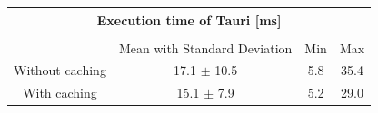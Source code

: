 \begin{tabular} {| c | c | c | c |}

    \hline
    \multicolumn{4}{|c|}{Execution time of Tauri [ms]} \\ \hline
    \multicolumn{4}{|c|}{}\\ \hline
    & Mean with Standard Deviation & Min & Max     \\ \hline
    Without caching & 17.1 $\pm$ 10.5 & 5.8 & 35.4  \\ \hline
    With caching & 15.1 $\pm$ 7.9 & 5.2 & 29.0 \\ \hline

\end{tabular} \\ \\
